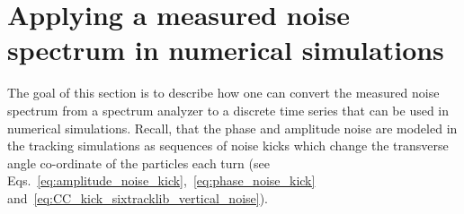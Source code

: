 
\section{Applying a measured noise spectrum in numerical simulations}\label{sec:measured_spectra_to_time_series}

The goal of this section is to describe how one can convert the measured noise spectrum from a spectrum analyzer to a discrete time series that can be used in numerical simulations. Recall, that the phase and amplitude noise are modeled in the tracking simulations as sequences of noise kicks which change the transverse angle co-ordinate of the particles each turn (see  Eqs.~\eqref{eq:amplitude_noise_kick},~\eqref{eq:phase_noise_kick} and~\eqref{eq:CC_kick_sixtracklib_vertical_noise}).








